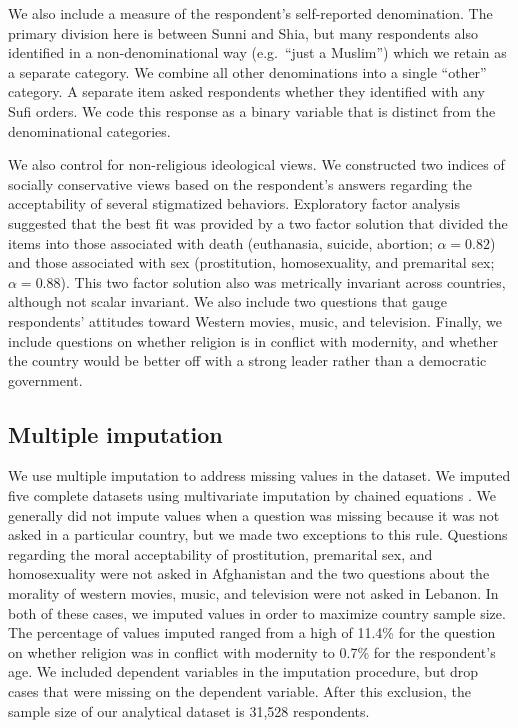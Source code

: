 \documentclass[10pt,letterpaper]{article}
\begin{document}
We also include a measure of the respondent's self-reported denomination. The primary division here is between Sunni and Shia, but many respondents also identified in a non-denominational way (e.g.~``just a Muslim'') which we retain as a separate category. We combine all other denominations into a single ``other'' category. A separate item asked respondents whether they identified with any Sufi orders. We code this response as a binary variable that is distinct from the denominational categories.

We also control for non-religious ideological views. We constructed two indices of socially conservative views based on the respondent's answers regarding the acceptability of several stigmatized behaviors. Exploratory factor analysis suggested that the best fit was provided by a two factor solution that divided the items into those associated with death (euthanasia, suicide, abortion; \(\alpha=0.82\)) and those associated with sex (prostitution, homosexuality, and premarital sex; \(\alpha=0.88\)). This two factor solution also was metrically invariant across countries, although not scalar invariant. We also include two questions that gauge respondents' attitudes toward Western movies, music, and television. Finally, we include questions on whether religion is in conflict with modernity, and whether the country would be better off with a strong leader rather than a democratic government.

\subsection*{Multiple imputation}

We use multiple imputation to address missing values in the dataset. We imputed five complete datasets using multivariate imputation by chained equations \cite{buuren_mice_2011}. We generally did not impute values when a question was missing because it was not asked in a particular country, but we made two exceptions to this rule. Questions regarding the moral acceptability of prostitution, premarital sex, and homosexuality were not asked in Afghanistan and the two questions about the morality of western movies, music, and television were not asked in Lebanon. In both of these cases, we imputed values in order to maximize country sample size. The percentage of values imputed ranged from a high of 11.4\% for the question on whether religion was in conflict with modernity to 0.7\% for the respondent's age. We included dependent variables in the imputation procedure, but drop cases that were missing on the dependent variable. After this exclusion, the sample size of our analytical dataset is 31,528 respondents.
\end{document}
